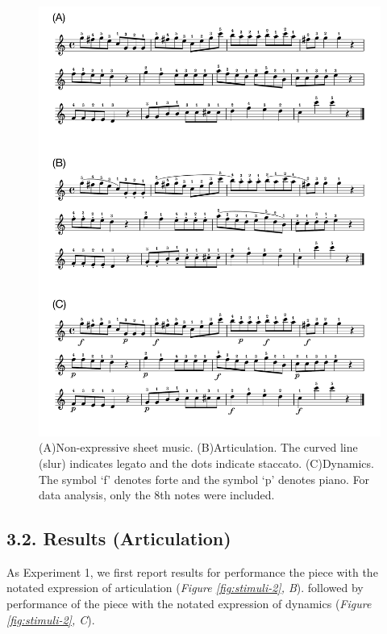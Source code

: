 \documentclass[
  english,
  man,floatsintext]{apa6}
\begin{document}
\begin{figure}
\includegraphics[width=1\linewidth]{manuscript_files/figure-latex/stim-2-1} \caption{\label{fig:stimuli-2}(A)Non-expressive sheet music. (B)Articulation. The curved line (slur) indicates legato and the dots indicate staccato. (C)Dynamics. The symbol `f' denotes forte and the symbol `p' denotes piano. For data analysis, only the 8th notes were included.}\label{fig:stim-2}
\end{figure}

\hypertarget{results-articulation-1}{%
\subsection{3.2. Results (Articulation)}\label{results-articulation-1}}

As Experiment 1, we first report results for performance the piece with the notated expression of articulation (\emph{Figure \ref{fig:stimuli-2}, B}). followed by performance of the piece with the notated expression of dynamics (\emph{Figure \ref{fig:stimuli-2}, C}).
\end{document}
